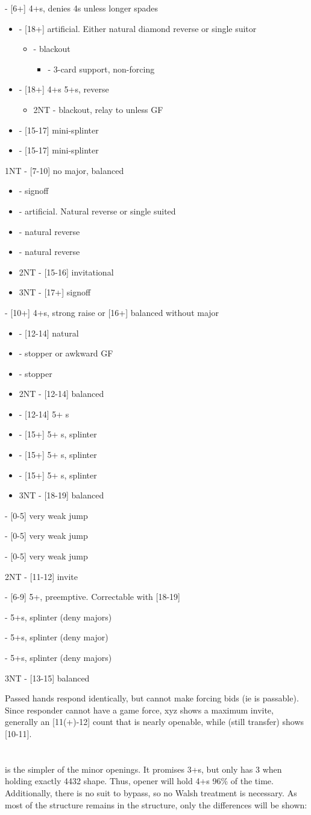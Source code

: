 \documentclass[12pt]{report}
\newcommand{\ul}[1]{\begin{itemize}#1\end{itemize}}
\newcommand{\li}{\item[~]}
\newcommand{\bidsection}[2]{\section{\texorpdfstring{#1}{#2}}}
\begin{document}
{{        }
        \li {} - [6+] 4+\sp{}s, denies 4\he{}s unless longer spades
        \ul {
            \li {} - [18+] artificial.  Either natural diamond reverse or single suitor
            \ul {
                \li \he2 - blackout
                \ul {
                    \li \sp2 - 3-card support, non-forcing
                }
            }
            \li \he2 - [18+] 4+\he{}s 5+\cl{}s, reverse
            \ul {
                \li 2NT - blackout, relay to \cl3 unless GF
            }
            \li \di3 - [15-17] mini-splinter
            \li \he3 - [15-17] mini-splinter
        }
        \li 1NT - [7-10] no major, balanced
        \ul {
            \li {} - signoff
            \li {} - artificial.  Natural reverse or single suited
            \li \he2 - natural reverse
            \li \sp2 - natural reverse
            \li 2NT - [15-16] invitational
            \li 3NT - [17+] signoff
            

        }
        \li {} - [10+] 4+\cl{}s, strong raise or [16+] balanced without major
        \ul {
            \li {} - [12-14] natural
            \li \he2 - stopper or awkward GF
            \li \sp2 - stopper
            \li 2NT - [12-14] balanced
            \li \cl3 - [12-14] 5+ \cl{}s
            \li \di3 - [15+] 5+ \cl{}s, splinter
            \li \he3 - [15+] 5+ \cl{}s, splinter
            \li \sp3 - [15+] 5+ \cl{}s, splinter
            \li 3NT - [18-19] balanced
        }

        \li {} - [0-5] very weak jump
        \li {} - [0-5] very weak jump
        \li {} - [0-5] very weak jump
        \li 2NT - [11-12] invite
        \li {} - [6-9] 5+\cl{}, preemptive.  Correctable with [18-19]
        \li {} - 5+\cl{}s, splinter (deny majors)
        \li {} - 5+\cl{}s, splinter (deny major)
        \li {} - 5+\cl{}s, splinter (deny majors)
        \li 3NT - [13-15] balanced
    }

    Passed hands respond identically, but cannot make forcing bids (ie  is passable).  Since responder cannot have a game force, xyz  shows a maximum invite, generally an [11(+)-12] count that is nearly openable, while  (still transfer) shows [10-11].
\newpage

\bidsection{}{1♢} \label{2:3}

     is the simpler of the minor openings.  It promises 3+\di{}s, but only has 3 when holding exactly 4432 shape.  Thus, opener will hold 4+\di{}s 96\% of the time.  Additionally, there is no suit to bypass, so no Walsh treatment is necessary.  As most of the  structure remains in the  structure, only the differences will be shown:
\end{document}
